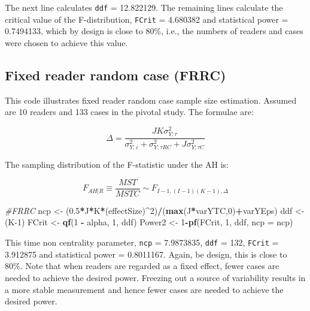 \documentclass[
]{book}
\newenvironment{Shaded}{\begin{snugshade}}{\end{snugshade}}
\newcommand{\CommentTok}[1]{\textcolor[rgb]{0.56,0.35,0.01}{\textit{#1}}}
\newcommand{\DataTypeTok}[1]{\textcolor[rgb]{0.13,0.29,0.53}{#1}}
\newcommand{\DecValTok}[1]{\textcolor[rgb]{0.00,0.00,0.81}{#1}}
\newcommand{\FloatTok}[1]{\textcolor[rgb]{0.00,0.00,0.81}{#1}}
\newcommand{\KeywordTok}[1]{\textcolor[rgb]{0.13,0.29,0.53}{\textbf{#1}}}
\newcommand{\NormalTok}[1]{#1}
\newcommand{\OperatorTok}[1]{\textcolor[rgb]{0.81,0.36,0.00}{\textbf{#1}}}
\newcommand{\StringTok}[1]{\textcolor[rgb]{0.31,0.60,0.02}{#1}}
\begin{document}
The next line calculates \texttt{ddf} = 12.822129. The remaining lines calculate the critical value of the F-distribution, \texttt{FCrit} = 4.680382 and statistical power = 0.7494133, which by design is close to 80\%, i.e., the numbers of readers and cases were chosen to achieve this value.

\hypertarget{fixed-reader-random-case-frrc}{%
\subsection{Fixed reader random case (FRRC)}\label{fixed-reader-random-case-frrc}}

This code illustrates fixed reader random case sample size estimation. Assumed are 10 readers and 133 cases in the pivotal study. The formulae are:

\begin{equation*} 
\Delta =\frac{JK\sigma _{Y;\tau }^{2}}{\sigma _{Y;\varepsilon }^{2}+\sigma _{Y;\tau RC}^{2}+J\sigma _{Y;\tau C}^{2}}
\end{equation*}

The sampling distribution of the F-statistic under the AH is:

\begin{equation*} 
{F_{\left. AH \right|R}}\equiv \frac{MST}{MSTC}\sim{F_{I-1,\left( I-1 \right)\left( K-1 \right),\Delta }} 
\end{equation*}

\begin{Shaded}
\begin{Highlighting}[]
\CommentTok{\#FRRC}
\NormalTok{ncp \textless{}{-}}\StringTok{ }\NormalTok{(}\FloatTok{0.5}\OperatorTok{*}\NormalTok{J}\OperatorTok{*}\NormalTok{K}\OperatorTok{*}\NormalTok{(effectSize)}\OperatorTok{\^{}}\DecValTok{2}\NormalTok{)}\OperatorTok{/}\NormalTok{(}\KeywordTok{max}\NormalTok{(J}\OperatorTok{*}\NormalTok{varYTC,}\DecValTok{0}\NormalTok{)}\OperatorTok{+}\NormalTok{varYEps)}
\NormalTok{ddf \textless{}{-}}\StringTok{ }\NormalTok{(K}\DecValTok{{-}1}\NormalTok{)}
\NormalTok{FCrit \textless{}{-}}\StringTok{ }\KeywordTok{qf}\NormalTok{(}\DecValTok{1} \OperatorTok{{-}}\StringTok{ }\NormalTok{alpha, }\DecValTok{1}\NormalTok{, ddf)}
\NormalTok{Power2 \textless{}{-}}\StringTok{ }\DecValTok{1}\OperatorTok{{-}}\KeywordTok{pf}\NormalTok{(FCrit, }\DecValTok{1}\NormalTok{, ddf, }\DataTypeTok{ncp =}\NormalTok{ ncp)}
\end{Highlighting}
\end{Shaded}

This time non centrality parameter, \texttt{ncp} = 7.9873835, \texttt{ddf} = 132, \texttt{FCrit} = 3.912875 and statistical power = 0.8011167. Again, be design, this is close to 80\%. Note that when readers are regarded as a fixed effect, fewer cases are needed to achieve the desired power. Freezing out a source of variability results in a more stable measurement and hence fewer cases are needed to achieve the desired power.
\end{document}
